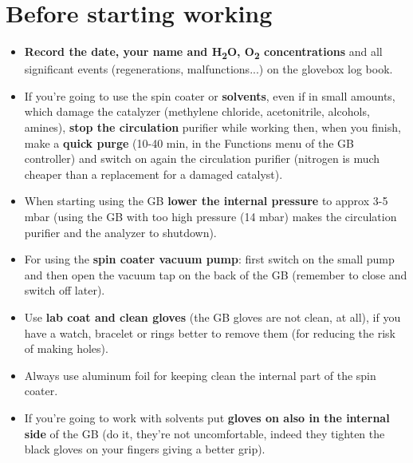 \documentclass[a4paper,15pt]{scrartcl}
\begin{document}
\section*{Before starting working}
\begin{itemize}
	\item     \textbf{Record the date, your name and H\textsubscript{2}O, O\textsubscript{2} concentrations} and all significant events (regenerations, malfunctions...) on the glovebox log book.
	\item     If you're going to use the spin coater or \textbf{solvents}, even if in small amounts, which damage the catalyzer (methylene chloride, acetonitrile, alcohols, amines), \textbf{stop the circulation} purifier while working then, when you finish, make a \textbf{quick purge} (10-40 min, in the Functions menu of the GB controller) and switch on again the circulation purifier (nitrogen is much cheaper than a replacement for a damaged catalyst).
	\item     When starting using the GB \textbf{lower the internal pressure} to approx 3-5 mbar (using the GB with too high pressure (14 mbar) makes the circulation purifier and the analyzer to shutdown).
	\item    For using the \textbf{spin coater vacuum pump}: first switch on the small pump and then open the vacuum tap on the back of the GB (remember to close and switch off later).
	\item     Use \textbf{lab coat and clean gloves} (the GB gloves are not clean, at all), if you have a watch, bracelet or rings better to remove them (for reducing the risk of making holes).
	\item     Always use aluminum foil for keeping clean the internal part of the spin coater.
	\item     If you're going to work with solvents put \textbf{gloves on also in the internal side} of the GB (do it, they're not uncomfortable, indeed they tighten the black gloves on your fingers giving a better grip).
\end{itemize}
\end{document}
